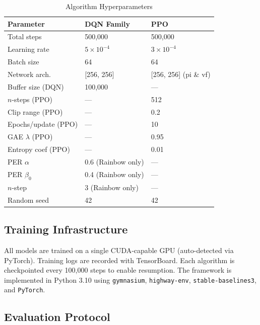 \documentclass[conference]{IEEEtran}
\begin{document}
\begin{table}[htbp]
\centering
\caption{Algorithm Hyperparameters}
\label{tab:hyperparams}
\begin{tabular}{@{}lll@{}}
\toprule
\textbf{Parameter} & \textbf{DQN Family} & \textbf{PPO} \\ \midrule
Total steps        & 500,000             & 500,000 \\
Learning rate      & $5 \times 10^{-4}$  & $3 \times 10^{-4}$ \\
Batch size         & 64                  & 64 \\
Network arch.      & [256, 256]          & [256, 256] (pi \& vf) \\
Buffer size (DQN)  & 100,000             & — \\
$n$-steps (PPO)    & —                   & 512 \\
Clip range (PPO)   & —                   & 0.2 \\
Epochs/update (PPO)& —                   & 10 \\
GAE $\lambda$ (PPO)& —                   & 0.95 \\
Entropy coef (PPO) & —                   & 0.01 \\
PER $\alpha$       & 0.6 (Rainbow only)  & — \\
PER $\beta_0$      & 0.4 (Rainbow only)  & — \\
$n$-step           & 3 (Rainbow only)    & — \\
Random seed        & 42                  & 42 \\
\bottomrule
\end{tabular}
\end{table}

\subsection{Training Infrastructure}

All models are trained on a single CUDA-capable GPU (auto-detected via PyTorch).
Training logs are recorded with TensorBoard. Each algorithm is checkpointed every
100,000 steps to enable resumption. The framework is implemented in Python 3.10 using
\texttt{gymnasium}, \texttt{highway-env}, \texttt{stable-baselines3}, and \texttt{PyTorch}.

\subsection{Evaluation Protocol}
\end{document}
